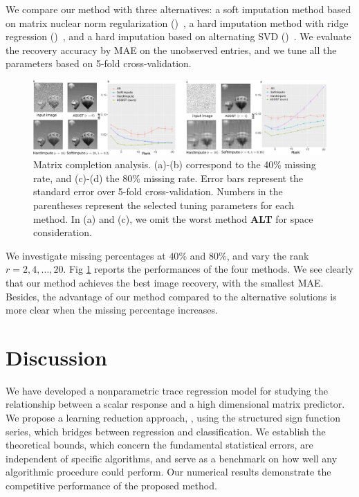 \documentclass[aos]{imsart}
\theoremstyle{definition}
\def\NonparaM{\text{\bf \footnotesize ASSIST}}
\def\HardImpute{\text{\bf \small HardImpute}}
\def\SoftImpute{\text{\bf \small SoftImpute}}
\def\ALT{\text{\bf \small ALT}}
\begin{document}
We compare our method with three alternatives: a soft imputation method based on matrix nuclear norm regularization (\SoftImpute)~\cite{hastie2015matrix}, a hard imputation method with ridge regression (\HardImpute)~\cite{mazumder2010spectral}, and a hard imputation based on alternating SVD (\ALT)~\cite{rennie2005fast}. We evaluate the recovery accuracy by MAE on the unobserved entries, and we tune all the parameters based on 5-fold cross-validation. 

\begin{figure}[t!]
\includegraphics[width = \textwidth]{figure/completion.pdf}
\caption{Matrix completion analysis. (a)-(b) correspond to the 40\% missing rate, and (c)-(d) the 80\% missing rate. Error bars represent the standard error over 5-fold cross-validation. Numbers in the parentheses represent the selected tuning parameters for each method. In (a) and (c), we omit the worst method {\bf \scriptsize ALT} for space consideration.}
\label{fig:braincv}
\end{figure}

We investigate missing percentages at $40\%$ and $80\%$, and vary the rank $r=2,4,\ldots,20$. Fig \ref{fig:braincv} reports the performances of the four methods. We see clearly that our method achieves the best image recovery, with the smallest MAE. Besides, the advantage of our method compared to the alternative solutions is more clear when the missing percentage increases. 





\section{Discussion}
\label{sec:discussion}

We have developed a nonparametric trace regression model for studying the relationship between a scalar response and a high dimensional matrix predictor. We propose a learning reduction approach, \NonparaM, using the structured sign function series, which bridges between regression and classification. We establish the theoretical bounds, which concern the fundamental statistical errors, are independent of specific algorithms, and serve as a benchmark on how well any algorithmic procedure could perform. Our numerical results demonstrate the competitive performance of the proposed method.
\end{document}
